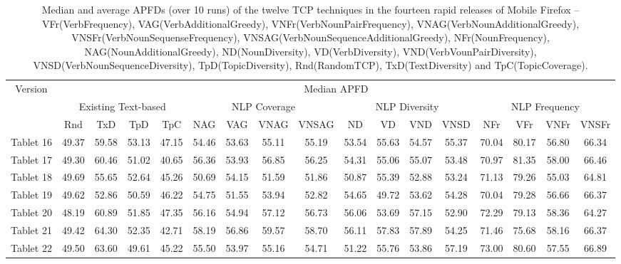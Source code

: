 \documentclass[conference]{IEEEtran}
\begin{document}

\begin{table*}[t!]
\centering
\caption{Median and average APFDs (over 10 runs) of the twelve TCP techniques in the fourteen rapid releases of Mobile Firefox --VFr(VerbFrequency), VAG(VerbAdditionalGreedy), VNFr(VerbNounPairFrequency), VNAG(VerbNounAdditionalGreedy), VNSFr(VerbNounSequenseFrequency), VNSAG(VerbNounSequenceAdditionalGreedy), NFr(NounFrequency), NAG(NounAdditionalGreedy), ND(NounDiversity), VD(VerbDiversity), VND(VerbVounPairDiversity), VNSD(VerbNounSequenceDiversity),
TpD(TopicDiversity), Rnd(RandomTCP), TxD(TextDiversity) and TpC(TopicCoverage).}
\label{table:7}
\begin{tabular}{ |c|c c c c|c c c c|c c c c|c c c c|}
\hline
\multirow{3}{*}{Version} &
\multicolumn{16}{|c|}{Median APFD} \\
\cline{2-17}
\multicolumn{1}{|c}{} & 
\multicolumn{4}{|c}{Existing Text-based} & \multicolumn{4}{|c}{NLP Coverage}& \multicolumn{4}{|c}{NLP Diversity} &
\multicolumn{4}{|c|}{NLP Frequency}\\
\cline{2-17}
&    Rnd                 & TxD   & TpD   & TpC   & NAG          & VAG   & VNAG  & VNSAG & ND            & VD    & VND   & VNSD  & NFr           & VFr   & VNFr  & VNSFr \\
\hline
Tablet 16 & 49.37 & 59.58 & 53.13 & 47.15 & 54.46 & 53.63 & 55.11 & 55.19 & 53.54 & 55.63 & 54.57 & 55.37 & 70.04 & 80.17 & 56.80 & 66.34 \\
Tablet 17 & 49.30 & 60.46 & 51.02 & 40.65 & 56.36 & 53.93 & 56.85 & 56.25 & 54.31 & 55.06 & 55.07 & 53.48 & 70.97 & 81.35 & 58.00 & 66.46 \\
Tablet 18 & 49.69 & 55.65 & 52.64 & 45.26 & 50.69 & 54.15 & 51.59 & 51.86 & 50.87 & 55.39 & 52.88 & 53.24 & 71.13 & 79.26 & 55.03 & 64.81 \\
Tablet 19 & 49.62 & 52.86 & 50.59 & 46.22 & 54.75 & 51.55 & 53.94 & 52.82 & 54.65 & 49.72 & 53.62 & 54.28 & 70.04 & 79.28 & 56.66 & 66.37 \\
Tablet 20 & 48.19 & 60.89 & 51.85 & 47.35 & 56.16 & 54.94 & 57.12 & 56.73 & 56.06 & 53.69 & 57.15 & 52.90 & 72.29 & 79.13 & 58.36 & 64.27 \\
Tablet 21 & 49.42 & 64.30 & 52.35 & 42.71 & 58.19 & 56.86 & 59.57 & 58.70 & 56.11 & 57.83 & 57.89 & 54.25 & 71.46 & 75.68 & 58.16 & 66.37 \\
Tablet 22 & 49.50 & 63.60 & 49.61 & 45.22 & 55.50 & 53.97 & 55.16 & 54.71 & 51.22 & 55.76 & 53.86 & 57.19 & 73.00 & 80.60 & 57.55 & 66.89 \\

\end{tabular}
\end{table*}
\end{document}
